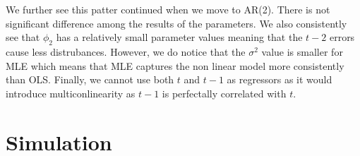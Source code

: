 \documentclass[12pt]{article}
\begin{document}
We further see this patter continued when we move to AR(2). There 
is not significant difference among the results of the parameters. We also 
consistently see that $\phi_2$ has a relatively small parameter values meaning 
that the $t-2$ errors cause less distrubances. However, we do notice that 
the $\sigma^2$ value is smaller for MLE which means that MLE captures 
the non linear model more consistently than OLS. Finally, we cannot use both $t$
and $t-1$ as regressors as it would introduce multiconlinearity as $t-1$ is perfectally 
correlated with $t$. 

\section*{Simulation}

\begin{figure}[H]
    \centering
    \label{fig:data_plot}
\end{figure}

\begin{figure}[H]
    \centering
    \label{fig:data_plot}
\end{figure}

\begin{figure}[H]
    \centering
    \label{fig:data_plot}
\end{figure}
\end{document}
